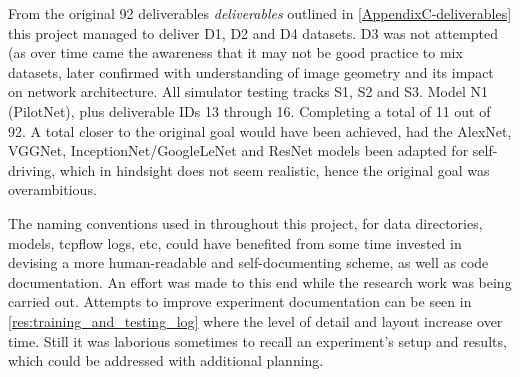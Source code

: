 From the original 92 deliverables \textit{deliverables} outlined in \ref{AppendixC-deliverables} this project managed to deliver D1, D2 and D4 datasets. D3 was not attempted (as over time came the awareness that it may not be good practice to mix datasets, later confirmed with understanding of image geometry and its impact on network architecture. All simulator testing tracks S1, S2 and S3. Model N1 (PilotNet), plus deliverable IDs 13 through 16. Completing a total of 11 out of 92. A total closer to the original goal would have been achieved, had the AlexNet, VGGNet, InceptionNet/GoogleLeNet and ResNet models been adapted for self-driving, which in hindsight does not seem realistic, hence the original goal was overambitious.


The naming conventions used in throughout this project, for data directories, models, tcpflow logs, etc, could have benefited from some time invested in devising a more human-readable and self-documenting scheme, as well as code documentation. An effort was made to this end while the research work was being carried out. Attempts to improve experiment documentation can be seen in \ref{res:training_and_testing_log} where the level of detail and layout increase over time. Still it was laborious sometimes to recall an experiment's setup and results, which could be addressed with additional planning.

